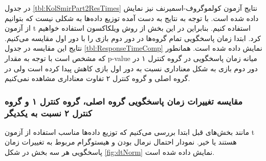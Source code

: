 \documentclass[twoside, a4paper,11pt]{book}
\numberwithin{equation}{chapter}
\numberwithin{table}{chapter}
\numberwithin{figure}{chapter}
\numberwithin{equation}{chapter}
\begin{document}
در جدول \ref{tbl:KolSmirPart2ResTimes} نتایج آزمون کولموگروف-اسمیرنف نیز نمایش داده شده است. با توجه به نتایج به دست آمده توزیع داده‌ها به شکلی نیست که بتوانیم از آزمون t استفاده کنیم. بنابراین در این بخش از روش ویلکاکسون استفاده خواهیم کرد.
ابتدا زمان پاسخگویی تمام گروه‌ها در دور دوم بازی را با دور اول مقایسه می‌کنیم. نتایج این مقایسه در جدول \ref{tbl:ResponseTimeComp} نمایش داده شده است. همانطور که مشخص است با توجه به مقدار p-value میانه زمان پاسخگویی در گروه کنترل ۱ در دور دوم بازی به شکل معناداری نسبت به دور اول بازی کاهش پیدا کرده است ولی در گروه اصلی و گروه کنترل ۲ تفاوت معناداری مشاهده نمی‌کنیم.
\begin{table}[]
\end{table}

\subsubsection{مقایسه تغییرات زمان پاسخگویی گروه اصلی، گروه کنترل ۱ و گروه کنترل ۲ نسبت به یکدیگر}
مانند بخش‌های قبل ابتدا بررسی می‌کنیم که توزیع داده‌ها مناسب استفاده از آزمون t هستند یا خیر. نمودار احتمال نرمال بودن و هیستوگرام مربوط به تغییرات زمان پاسخگویی هر سه بخش در شکل \ref{fig:dtNorm} نمایش داده شده است.
\end{document}
